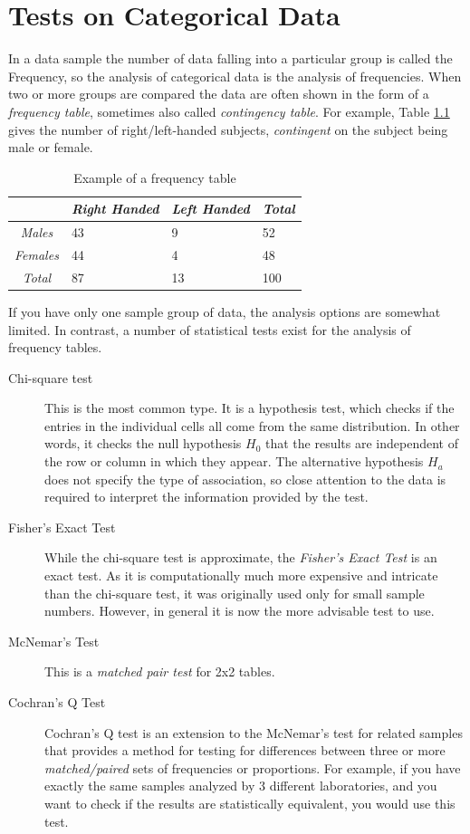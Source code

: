 \chapter{Tests on Categorical Data }

In a data sample the number of data falling into a particular group is called the Frequency, so the analysis of categorical data is the analysis of frequencies. When two or more groups are compared the data are often shown in the form of a \emph{frequency table}, sometimes also called \emph{contingency table}. For example, Table \ref{table:frequency} gives the number of right/left-handed subjects, \emph{contingent} on the subject being male or female.

\begin{table}
  \centering
  \begin{tabular}{|c|l l l|}
  \hline
  & \emph{Right Handed} & \emph{Left Handed} & \emph{Total} \\
  \hline
  \emph{Males} & 43 & 9 & 52 \\
  \emph{Females} & 44 & 4 & 48 \\
  \emph{Total} & 87 & 13 & 100 \\
  \hline
  \end{tabular}

  \caption{Example of a frequency table}\label{table:frequency}
\end{table}

If you have only one sample group of data, the analysis options are somewhat limited. In contrast, a number of statistical tests exist for the analysis of frequency tables.

\begin{description}
  \item[Chi-square test] This is the most common type. It is a hypothesis test, which checks if the entries in the individual cells all come from the same distribution. In other words, it checks the null hypothesis $H_0$ that the results are independent of the row or column in which they appear. The alternative hypothesis $H_a$ does not specify the type of association, so close attention to the data is required to interpret the information provided by the test.
  \item[Fisher's Exact Test] While the chi-square test is approximate, the \emph{Fisher's Exact Test} is an exact test. As it is computationally much more expensive and intricate than the chi-square test, it was originally used only for small sample numbers. However, in general it is now the more advisable test to use.
  \item[McNemar's Test]  This is a \emph{matched pair test }for 2x2 tables.
  \item[Cochran's Q Test]  Cochran's Q test is an extension to the McNemar's test for related samples that provides a method for testing for differences between three or more \emph{matched/paired} sets of frequencies or proportions. For example, if you have exactly the same samples analyzed by 3 different laboratories, and you want to check if the results are statistically equivalent, you would use this test.
\end{description}


